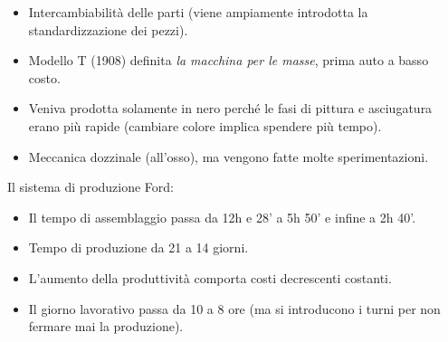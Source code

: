 \documentclass[a4paper,portrait,12pt]{article}
\theoremstyle{definition}
\begin{document}
\begin{itemize}
\item Intercambiabilità delle parti (viene ampiamente introdotta la standardizzazione dei pezzi).
\item Modello T (1908) definita \emph{la macchina per le masse}, prima auto a basso costo.
\item Veniva prodotta solamente in nero perché le fasi di pittura e asciugatura erano più rapide (cambiare colore implica spendere più tempo).
\item Meccanica dozzinale (all'osso), ma vengono fatte molte sperimentazioni.
\end{itemize}

\noindent
Il sistema di produzione Ford:
\begin{itemize}
\item Il tempo di assemblaggio passa da 12h e 28' a 5h 50' e infine a 2h 40'.
\item Tempo di produzione da 21 a 14 giorni.
\item L'aumento della produttività comporta costi decrescenti costanti.
\item Il giorno lavorativo passa da 10 a 8 ore (ma si introducono i turni per non fermare mai la produzione).
\end{itemize}



\end{document}
